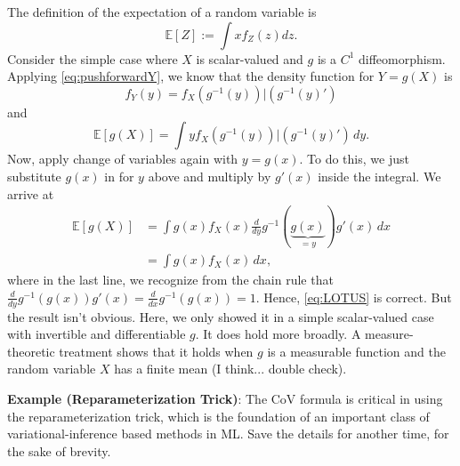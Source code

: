 \documentclass{book}
\newcommand{\dx}{\, dx}
\newcommand{\dy}{\, dy}
\newcommand{\E}{\mathbb{E}}
\begin{document}
The definition of the expectation of a random variable is
$$
\E[Z] := \int x f_Z(z) dz. 
$$
Consider the simple case where $X$ is scalar-valued and $g$ is a $C^1$ diffeomorphism. Applying \eqref{eq:pushforwardY}, we know that the density function for $Y = g(X)$ is
$$
f_Y(y) = f_X(g^{-1}(y)) |(g^{-1}(y)')
$$
and 
$$
\E[g(X)] = \int y f_X(g^{-1}(y)) |(g^{-1}(y)') \dy. 
$$
Now, apply change of variables again with $y = g(x)$. To do this, we just substitute $g(x)$ in for $y$ above and multiply by $g'(x)$ inside the integral. We arrive at
\begin{align}
\E[g(X)] & = \int g(x) f_X(x) \frac{d}{dy} g^{-1}(\underbrace{g(x)}_{=y}) g'(x) \dx\\
& = \int g(x) f_X(x) \dx,
\end{align}
where in the last line, we recognize from the chain rule that $\frac{d}{dy} g^{-1}(g(x)) g'(x)  = \frac{d}{dx} g^{-1}(g(x)) = 1$. 
Hence, \eqref{eq:LOTUS} is correct. But the result isn't obvious. Here, we only showed it in a simple scalar-valued case with invertible and differentiable $g$. It does hold more broadly. A measure-theoretic treatment shows that it holds when $g$ is a measurable function and the random variable $X$ has a finite mean (I think... double check). 

\vspace{1em} \noindent
\textbf{Example (Reparameterization Trick)}: The CoV formula is critical in using the reparameterization trick, which is the foundation of an important class of variational-inference based methods in ML. Save the details for another time, for the sake of brevity. 
\end{document}
